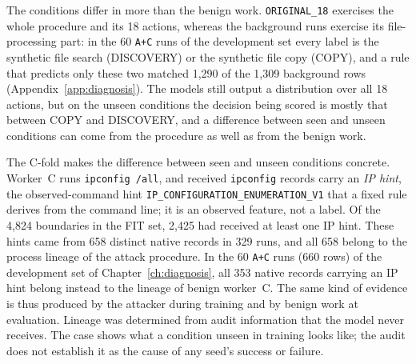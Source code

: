 The conditions differ in more than the benign work.
\texttt{ORIGINAL\_18} exercises the whole procedure and its 18 actions,
whereas the background runs exercise its file-processing part: in the
60 \texttt{A+C} runs of the development set every label is the
synthetic file search (DISCOVERY) or the synthetic file copy (COPY),
and a rule that predicts only these two matched 1,290 of the 1,309
background rows (Appendix~\ref{app:diagnosis}). The models still output
a distribution over all 18 actions, but on the unseen conditions the
decision being scored is mostly that between COPY and DISCOVERY, and a
difference between seen and unseen conditions can come from the
procedure as well as from the benign work.

The C-fold makes the difference between seen and unseen conditions
concrete. Worker~C runs \texttt{ipconfig /all}, and received \texttt{ipconfig}
records carry an \emph{IP hint}, the observed-command hint
\texttt{IP\_CONFIGURATION\_\allowbreak ENUMERATION\_\allowbreak V1} that a fixed rule derives
from the command line; it is an observed feature, not a label. Of the 4,824 boundaries in the
FIT set, 2,425 had received at least one IP hint. These hints came from
658 distinct native records in 329 runs, and all 658 belong to the
process lineage of the attack procedure. In the 60 \texttt{A+C}
runs (660 rows) of the development set of Chapter~\ref{ch:diagnosis}, all 353 native records carrying an IP hint
belong instead to the lineage of benign worker~C. The same kind of
evidence is thus produced by the attacker during training and by benign
work at evaluation. Lineage was determined from audit information that
the model never receives. The case shows what a condition
unseen in training looks like; the audit does not establish it as the
cause of any seed's success or failure.
